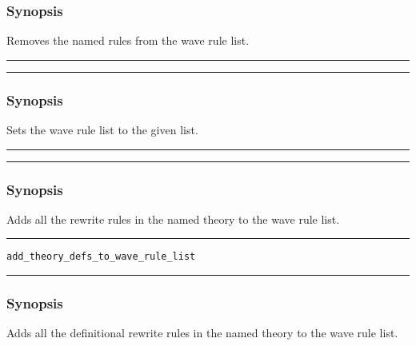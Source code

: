 \subsubsection*{Synopsis}
Removes the named rules from the wave rule list.

\vspace{2mm}
\hrule
\vspace{2mm}
\begin{Large}
\end{Large}
\vspace{2mm}
\hrule
\vspace{2mm}


\subsubsection*{Synopsis}
Sets the wave rule list to the given list.

\vspace{2mm}
\hrule
\vspace{2mm}
\begin{Large}
\end{Large}
\vspace{2mm}
\hrule
\vspace{2mm}


\subsubsection*{Synopsis}
Adds all the rewrite rules in the named theory to the wave rule list.

\vspace{2mm}
\hrule
\vspace{2mm}
\begin{Large}
{\tt  add\_theory\_defs\_to\_wave\_rule\_list}
\end{Large}
\vspace{2mm}
\hrule
\vspace{2mm}


\subsubsection*{Synopsis}
Adds all the definitional rewrite rules in the named theory to the wave
rule list.

